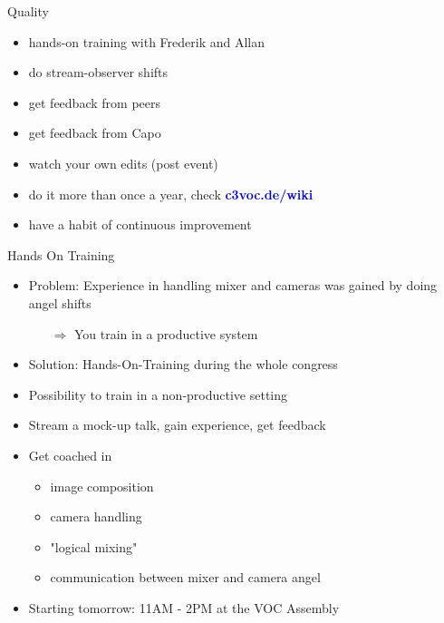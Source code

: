 \documentclass[aspectratio=169]{beamer}
\begin{document}
\begin{frame}{Quality}
\begin{itemize} [<+->]
\item hands-on training with Frederik and Allan %
\item do stream-observer shifts %
\item get feedback from peers %
\item get feedback from Capo %
\item watch your own edits (post event) %
\item do it more than once a year, check 
\textcolor{blue}{\textbf{c3voc.de/wiki }} %
\item have a habit of continuous improvement %
\end{itemize} 
\end{frame}

\begin{frame}{Hands On Training}
\begin{itemize}
\item Problem: Experience in handling mixer and cameras was gained by doing angel shifts 
\begin{itemize}
\item[$\Rightarrow$] You train in a productive system
\end{itemize}
\item Solution: Hands-On-Training during the whole congress
\item Possibility to train in a non-productive setting
\item Stream a mock-up talk, gain experience, get feedback
\item Get coached in
	\begin{itemize}
	\item image composition
	\item camera handling
	\item "logical mixing"
	\item communication between mixer and camera angel
	\end{itemize}
\item Starting tomorrow: 11AM - 2PM at the VOC Assembly
\end{itemize} 
\end{frame}
\end{document}
